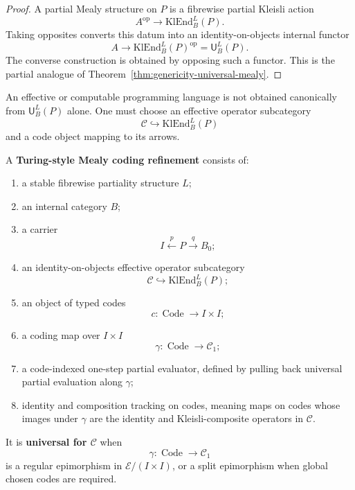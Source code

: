 \begin{proof}
A partial Mealy structure on \(P\) is a fibrewise partial Kleisli action
\[
        A^{\operatorname{op}}\longrightarrow \mathrm{KlEnd}^L_B(P).
\]
Taking opposites converts this datum into an identity-on-objects internal functor
\[
        A\longrightarrow
        \mathrm{KlEnd}^L_B(P)^{\operatorname{op}}
        =
        \mathsf U^L_B(P).
\]
The converse construction is obtained by opposing such a functor.  This is the partial analogue of
Theorem~\ref{thm:genericity-universal-mealy}.
\end{proof}

An effective or computable programming language is not obtained canonically from
\(\mathsf U^L_B(P)\) alone.  One must choose an effective operator subcategory
\[
        \mathcal C\hookrightarrow \mathrm{KlEnd}^L_B(P)
\]
and a code object mapping to its arrows.

\begin{definition}
A \textbf{Turing-style Mealy coding refinement} consists of:
\begin{enumerate}
    \item a stable fibrewise partiality structure \(L\);
    \item an internal category \(B\);
    \item a carrier
    \[
            I\xleftarrow{p}P\xrightarrow{q}B_0;
    \]
    \item an identity-on-objects effective operator subcategory
    \[
            \mathcal C\hookrightarrow \mathrm{KlEnd}^L_B(P);
    \]
    \item an object of typed codes
    \[
            c:\operatorname{Code}\to I\times I;
    \]
    \item a coding map over \(I\times I\)
    \[
            \gamma:\operatorname{Code}\to \mathcal C_1;
    \]
    \item a code-indexed one-step partial evaluator, defined by pulling back universal partial
    evaluation along \(\gamma\);
    \item identity and composition tracking on codes, meaning maps on codes whose images under
    \(\gamma\) are the identity and Kleisli-composite operators in \(\mathcal C\).
\end{enumerate}
It is \textbf{universal for \(\mathcal C\)} when
\[
        \gamma:\operatorname{Code}\to\mathcal C_1
\]
is a regular epimorphism in \(\mathcal E/(I\times I)\), or a split epimorphism when global chosen
codes are required.
\end{definition}

